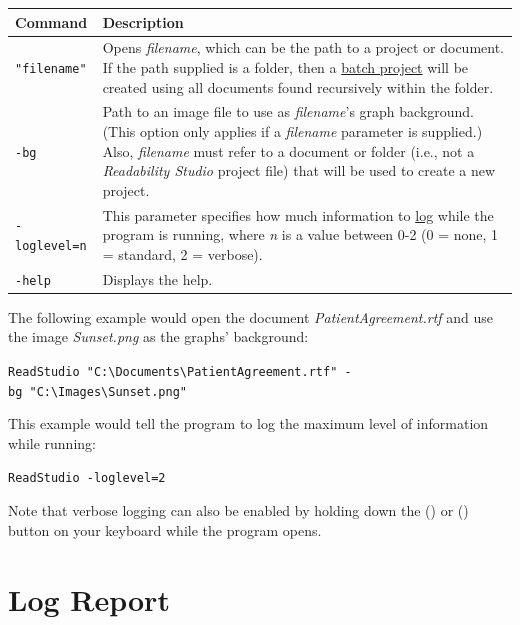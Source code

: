 \documentclass[
]{book}
\newenvironment{darkmode}
  {
  \begin{mdframed}[backgroundcolor=black]
  \color{white}
  }
  {
  \end{mdframed}
  }
\theoremstyle{definition}
\theoremstyle{definition}
\theoremstyle{definition}
\theoremstyle{definition}
\theoremstyle{remark}
\begin{document}
\begin{longtable}[]{@{}
  >{\raggedright\arraybackslash}p{}
  >{\raggedright\arraybackslash}p{}@{}}
\toprule
Command & Description \\
\midrule
\endhead
\texttt{"filename"} & Opens \emph{filename}, which can be the path to a project or document. If the path supplied is a folder, then a \protect\hyperlink{creating-batch-project}{batch project} will be created using all documents found recursively within the folder. \\
\texttt{-bg} & Path to an image file to use as \emph{filename}'s graph background. (This option only applies if a \emph{filename} parameter is supplied.) Also, \emph{filename} must refer to a document or folder (i.e., not a \emph{Readability Studio} project file) that will be used to create a new project. \\
\texttt{-loglevel=n} & This parameter specifies how much information to \protect\hyperlink{log-report}{log} while the program is running, where \emph{n} is a value between 0-2 (0 = none, 1 = standard, 2 = verbose). \\
\texttt{-help} & Displays the help. \\
\bottomrule
\end{longtable}

The following example would open the document \emph{PatientAgreement.rtf} and use the image \emph{Sunset.png} as the graphs' background:

\begin{darkmode}
\texttt{ReadStudio\ "C:\textbackslash{}Documents\textbackslash{}PatientAgreement.rtf"\ -bg\ "C:\textbackslash{}Images\textbackslash{}Sunset.png"}

\end{darkmode}

This example would tell the program to log the maximum level of information while running:

\begin{darkmode}
\texttt{ReadStudio\ -loglevel=2}

\end{darkmode}

Note that verbose logging can also be enabled by holding down the  (\faWindows) or \keys{\shift} (\faApple) button on your keyboard while the program opens.

\hypertarget{log-report}{%
\section{Log Report}\label{log-report}}
\end{document}
